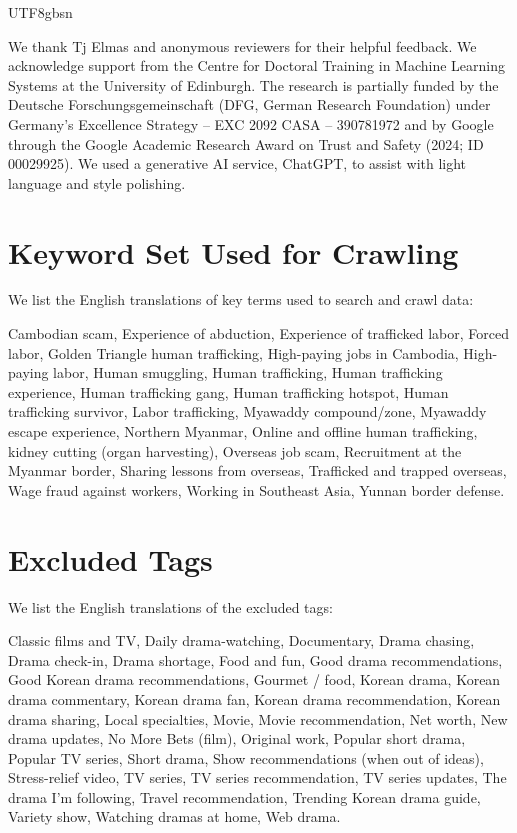 \documentclass[sigconf,nonacm]{acmart}
\begin{document}
\begin{CJK}{UTF8}{gbsn}
\begin{acks}
We thank Tj Elmas and anonymous reviewers for their helpful feedback. We  acknowledge support from the Centre for Doctoral Training in Machine Learning Systems at the University of Edinburgh. The research is partially funded by the Deutsche Forschungsgemeinschaft (DFG, German Research Foundation) under Germany's Excellence Strategy -- EXC 2092 CASA -- 390781972 and by Google through the Google Academic Research Award on Trust and Safety (2024; ID 00029925).
We used a generative AI service, ChatGPT, to assist with light language and style polishing.
\end{acks}





\appendix

\section{Keyword Set Used for Crawling}
\label{appendix:keywords}

We list the English translations of key terms used to search and crawl data:

{\ttfamily\small\raggedright
Cambodian scam, Experience of abduction, Experience of trafficked labor, Forced labor, 
Golden Triangle human trafficking, High-paying jobs in Cambodia, High-paying labor, 
Human smuggling, Human trafficking, Human trafficking experience, Human trafficking gang, 
Human trafficking hotspot, Human trafficking survivor, Labor trafficking, 
Myawaddy compound/zone, Myawaddy escape experience, Northern Myanmar, 
Online and offline human trafficking, kidney cutting (organ harvesting), 
Overseas job scam, Recruitment at the Myanmar border, Sharing lessons from overseas, 
Trafficked and trapped overseas, Wage fraud against workers, Working in Southeast Asia, 
Yunnan border defense.
\par}

\section{Excluded Tags}
\label{appendix:excluded_tags}

We list the English translations of the excluded tags:

{\ttfamily\small\raggedright
Classic films and TV, Daily drama-watching, Documentary, Drama chasing, Drama check-in, 
Drama shortage, Food and fun, Good drama recommendations, Good Korean drama recommendations, 
Gourmet / food, Korean drama, Korean drama commentary, Korean drama fan, 
Korean drama recommendation, Korean drama sharing, Local specialties, Movie, 
Movie recommendation, Net worth, New drama updates, No More Bets (film), 
Original work, Popular short drama, Popular TV series, Short drama, 
Show recommendations (when out of ideas), Stress-relief video, TV series, 
TV series recommendation, TV series updates, The drama I'm following, 
Travel recommendation, Trending Korean drama guide, Variety show, 
Watching dramas at home, Web drama.
\par}


\end{CJK}
\end{document}
